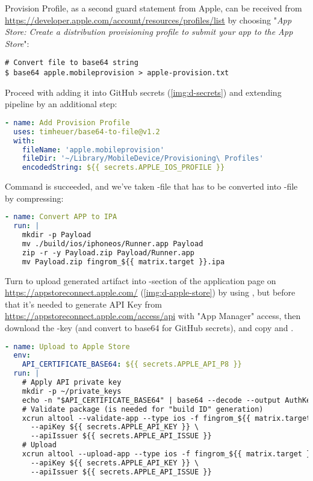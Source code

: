 Provision Profile, as a second guard statement from Apple, can be received from
\href{https://developer.apple.com/account/resources/profiles/list}{https://developer.apple.com/account/resources/profiles/list}
by choosing "\emph{App Store: Create a distribution provisioning profile to submit your app to the App Store}":

\begin{lstlisting}[language=terminal]
# Convert file to base64 string
$ base64 apple.mobileprovision > apple-provision.txt
\end{lstlisting}

\noindent Proceed with adding it into GitHub secrets (\cref{img:d-secrets}) and extending pipeline by an additional step:

\begin{lstlisting}[language=yaml]
- name: Add Provision Profile
  uses: timheuer/base64-to-file@v1.2
  with:
    fileName: 'apple.mobileprovision'
    fileDir: '~/Library/MobileDevice/Provisioning\ Profiles'
    encodedString: ${{ secrets.APPLE_IOS_PROFILE }}
\end{lstlisting}

\noindent Command  is succeeded, and we've taken -file that has to be 
converted into -file by compressing:

\begin{lstlisting}[language=yaml]
- name: Convert APP to IPA
  run: |
    mkdir -p Payload
    mv ./build/ios/iphoneos/Runner.app Payload
    zip -r -y Payload.zip Payload/Runner.app
    mv Payload.zip fingrom_${{ matrix.target }}.ipa
\end{lstlisting}


\noindent Turn to upload generated artifact into -section of the application page on 
\href{https://appstoreconnect.apple.com/}{https://appstoreconnect.apple.com/} (\cref{img:d-apple-store}) by using 
, but before that it's needed to generate API Key from 
\href{https://appstoreconnect.apple.com/access/api}{https://appstoreconnect.apple.com/access/api} with "App Manager"
access, then download the -key (and convert to base64 for GitHub secrets), and copy  and .

\begin{lstlisting}[language=yaml]
- name: Upload to Apple Store
  env:
    API_CERTIFICATE_BASE64: ${{ secrets.APPLE_API_P8 }}
  run: |
    # Apply API private key
    mkdir -p ~/private_keys
    echo -n "$API_CERTIFICATE_BASE64" | base64 --decode --output AuthKey_${{ secrets.APPLE_API_KEY }}.p8
    # Validate package (is needed for "build ID" generation)
    xcrun altool --validate-app --type ios -f fingrom_${{ matrix.target }}.ipa \ 
      --apiKey ${{ secrets.APPLE_API_KEY }} \
      --apiIssuer ${{ secrets.APPLE_API_ISSUE }}
    # Upload
    xcrun altool --upload-app --type ios -f fingrom_${{ matrix.target }}.ipa \
      --apiKey ${{ secrets.APPLE_API_KEY }} \
      --apiIssuer ${{ secrets.APPLE_API_ISSUE }}
\end{lstlisting}

